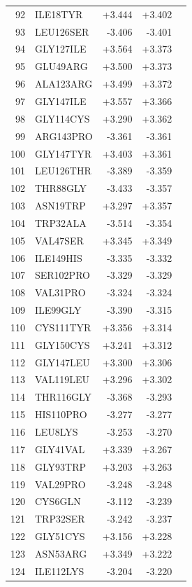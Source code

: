 \begin{longtable}{r l r r c}
92 & ILE18TYR & +3.444 & +3.402 &  \\
93 & LEU126SER & -3.406 & -3.401 &  \\
94 & GLY127ILE & +3.564 & +3.373 &  \\
95 & GLU49ARG & +3.500 & +3.373 &  \\
96 & ALA123ARG & +3.499 & +3.372 &  \\
97 & GLY147ILE & +3.557 & +3.366 &  \\
98 & GLY114CYS & +3.290 & +3.362 &  \\
99 & ARG143PRO & -3.361 & -3.361 &  \\
100 & GLY147TYR & +3.403 & +3.361 &  \\
101 & LEU126THR & -3.389 & -3.359 &  \\
102 & THR88GLY & -3.433 & -3.357 &  \\
103 & ASN19TRP & +3.297 & +3.357 &  \\
104 & TRP32ALA & -3.514 & -3.354 &  \\
105 & VAL47SER & +3.345 & +3.349 &  \\
106 & ILE149HIS & -3.335 & -3.332 &  \\
107 & SER102PRO & -3.329 & -3.329 &  \\
108 & VAL31PRO & -3.324 & -3.324 &  \\
109 & ILE99GLY & -3.390 & -3.315 &  \\
110 & CYS111TYR & +3.356 & +3.314 &  \\
111 & GLY150CYS & +3.241 & +3.312 &  \\
112 & GLY147LEU & +3.300 & +3.306 &  \\
113 & VAL119LEU & +3.296 & +3.302 &  \\
114 & THR116GLY & -3.368 & -3.293 &  \\
115 & HIS110PRO & -3.277 & -3.277 &  \\
116 & LEU8LYS & -3.253 & -3.270 &  \\
117 & GLY41VAL & +3.339 & +3.267 &  \\
118 & GLY93TRP & +3.203 & +3.263 &  \\
119 & VAL29PRO & -3.248 & -3.248 &  \\
120 & CYS6GLN & -3.112 & -3.239 &  \\
121 & TRP32SER & -3.242 & -3.237 &  \\
122 & GLY51CYS & +3.156 & +3.228 &  \\
123 & ASN53ARG & +3.349 & +3.222 &  \\
124 & ILE112LYS & -3.204 & -3.220 &  \\

\end{longtable}
